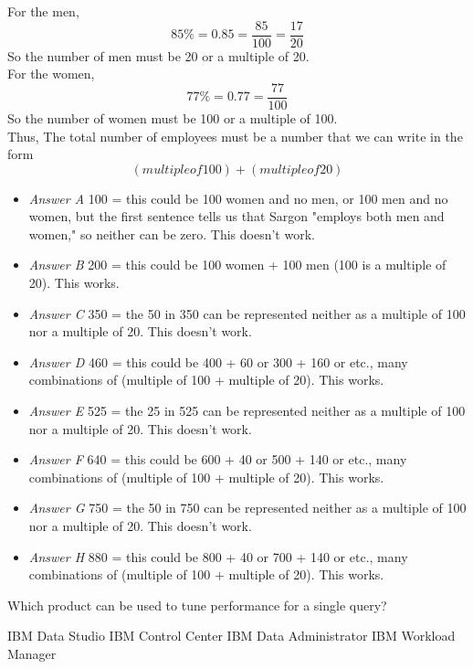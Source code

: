\documentclass[answers, 11pt]{exam}
\begin{document}
\begin{questions}
\begin{solution}
For the men,
\begin{equation}
85\% = 0.85 = \frac{85}{100} = \frac{17}{20}
\end{equation}
So the number of men must be 20 or a multiple of 20.\\ 
For the women,
\begin{equation}
77\% = 0.77 = \frac{77}{100}
\end{equation}
So the number of women must be 100 or a multiple of 100.\\ 
Thus, The total number of employees must be a number that we can write in the form
\begin{equation}
(multiple of 100) + (multiple of 20) 
\end{equation} 
\begin{itemize}
\item\textit{Answer A} 100 = this could be 100 women and no men, or 100 men and no women, but the first sentence tells us that Sargon "employs both men and women," so neither can be zero.
This doesn't work. 
\item\textit{Answer B} 200 = this could be 100 women + 100 men (100 is a multiple of 20). This works.
\item\textit{Answer C} 350 = the 50 in 350 can be represented neither as a multiple of 100 nor a multiple of 20. This doesn't work. 
\item\textit{Answer D} 460 = this could be 400 + 60 or 300 + 160 or etc., many combinations of (multiple of 100 + multiple of 20). This works. 
\item\textit{Answer E} 525 = the 25 in 525 can be represented neither as a multiple of 100 nor a multiple of 20. This doesn't work. 
\item\textit{Answer F} 640 = this could be 600 + 40 or 500 + 140 or etc., many combinations of (multiple of 100 + multiple of 20). This works.
\item\textit{Answer G} 750 = the 50 in 750 can be represented neither as a multiple of 100 nor a multiple of 20. This doesn't work.
\item\textit{Answer H} 880 = this could be 800 + 40 or 700 + 140 or etc., many combinations of (multiple of 100 + multiple of 20). This works. 
\end{itemize}
\end{solution}

\question[1]
Which product can be used to tune performance for a single query?
\begin{choices}
\CorrectChoice IBM Data Studio
\choice IBM Control Center
\choice IBM Data Administrator
\choice IBM Workload Manager
\end{choices}


\end{questions}
\end{document}
